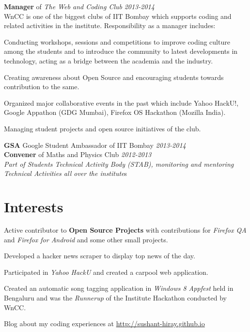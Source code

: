 \documentclass[margin,11pt]{resume}
\begin{document}
\begin{resume}
\textbf{Manager} of \emph{The Web and Coding Club} \hfill \emph{2013-2014}\\
WnCC is one of the biggest clubs of IIT Bombay which supports coding and related activities in the institute. Responsibility as a manager includes:
\begin{list2}
\item Conducting workshops, sessions and competitions to improve coding culture among the students and to introduce the community to latest developments in technology, acting as a bridge between the academia and the industry. 
\item Creating awareness about Open Source and encouraging students towards contribution to the same. 
\item Organized major collaborative events in the past which include Yahoo HackU!, Google Appathon (GDG Mumbai), Firefox OS Hackathon (Mozilla India). 
\item Managing student projects and open source initiatives of the club. 
\end{list2}
\textbf{GSA} Google Student Ambassador of IIT Bombay \hfill \emph{2013-2014} \\
\textbf{Convener} of Maths and Physics Club \hfill \emph{2012-2013} \\
\emph{Part of Students Technical Activity Body (STAB), monitoring and mentoring Technical Activities all over the institute}s

\section{\mysidestyle Interests}

\begin{list2}
\item Active contributor to \textbf{Open Source Projects} with contributions for \emph{Firefox QA} and \emph{Firefox for Android} and some other small projects.
\item Developed a hacker news scraper to display top news of the day.
\item Participated in \emph{Yahoo HackU} and created a carpool web application.
\item Created an automatic song tagging application in \emph{Windows 8 Appfest} held in Bengaluru and was the \emph{Runnerup} of the Institute Hackathon conducted by WnCC.
\item Blog about my coding experiences at  \url{http://sushant-hiray.github.io} 
\end{list2}


\end{resume}
\end{document}
